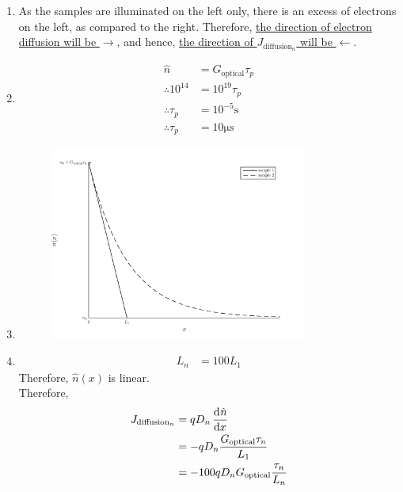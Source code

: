 \documentclass[fleqn, a4paper, 11pt, oneside]{amsart}
\theoremstyle{definition}
\theoremstyle{theorem}
\renewcommand{\emph}{\uline}
\begin{document}
\begin{solution}
	\begin{enumerate}[leftmargin=*]
		\item
			As the samples are illuminated on the left only, there is an excess of electrons on the left, as compared to the right.
			Therefore, \emph{the direction of electron diffusion will be $\rightarrow$}, and hence, \emph{the direction of $J_{\text{diffusion}_n}$ will be $\leftarrow$}.
		\item
			\begin{align*}
				\hat{n}            & = G_{\text{optical}} \tau_p \\
				\therefore 10^{14} & = 10^{19} \tau_p            \\
				\therefore \tau_p  & = 10^{-5} \si{\second}      \\
				\therefore \tau_p  & = 10 \si{\micro\second}
			\end{align*}
		\item
			\begin{figure}[H]
				\centering
				\includegraphics[width = 0.8\textwidth]{plot1.pdf}
			\end{figure}
		\item
			\begin{align*}
				L_n & = 100 L_1
			\end{align*}
			Therefore, $\hat{n}(x)$ is linear.\\
			Therefore,
			\begin{align*}
				J_{\text{diffusion}_n} & = q D_n \dod{\hat{n}}{x}                           \\
                                                       & = -q D_n \frac{G_{\text{optical}} \tau_n}{L_1}     \\
                                                       & = -100 q D_n G_{\text{optical}} \frac{\tau_n}{L_n} \\

\end{align*}
\end{enumerate}
\end{solution}
\end{document}
